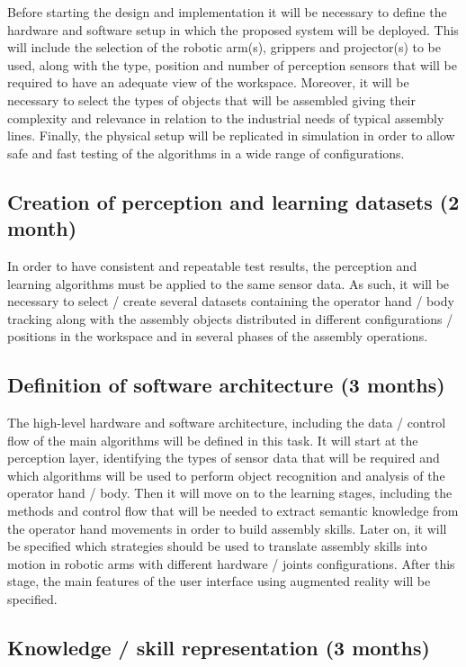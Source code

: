 Before starting the design and implementation it will be necessary to define the hardware and software setup in which the proposed system will be deployed. This will include the selection of the robotic arm(s), grippers and projector(s) to be used, along with the type, position and number of perception sensors that will be required to have an adequate view of the workspace. Moreover, it will be necessary to select the types of objects that will be assembled giving their complexity and relevance in relation to the industrial needs of typical assembly lines.
Finally, the physical setup will be replicated in simulation in order to allow safe and fast testing of the algorithms in a wide range of configurations.


\subsection{Creation of perception and learning datasets (2 month)}

In order to have consistent and repeatable test results, the perception and learning algorithms must be applied to the same sensor data. As such, it will be necessary to select / create several datasets containing the operator hand / body tracking along with the assembly objects distributed in different configurations / positions in the workspace and in several phases of the assembly operations.


\subsection{Definition of software architecture (3 months)}

The high-level hardware and software architecture, including the data / control flow of the main algorithms will be defined in this task. It will start at the perception layer, identifying the types of sensor data that will be required and which algorithms will be used to perform object recognition and analysis of the operator hand / body. Then it will move on to the learning stages, including the methods and control flow that will be needed to extract semantic knowledge from the operator hand movements in order to build assembly skills. Later on, it will be specified which strategies should be used to translate assembly skills into motion in robotic arms with different hardware / joints configurations. After this stage, the main features of the user interface using augmented reality will be specified.


\subsection{Knowledge / skill representation (3 months)}

